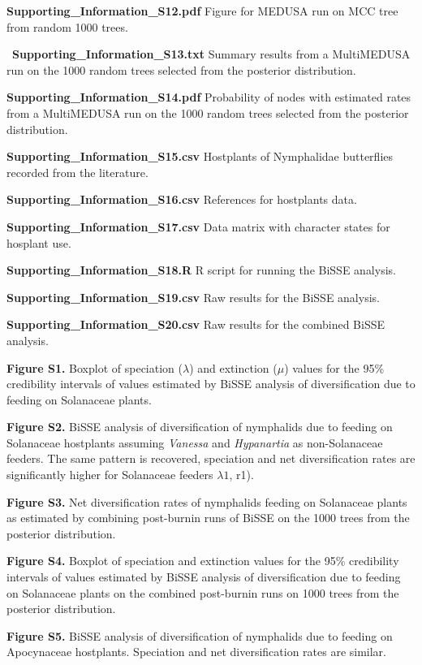 \documentclass[10pt]{article}
\begin{document}
\begin{description}
 \item {\bf Supporting\_Information\_S12.pdf} Figure for MEDUSA run on MCC
tree from random 1000 trees.

 \item {\bf Supporting\_Information\_S13.txt} Summary results from a
MultiMEDUSA run on the 1000 random trees selected from the posterior
distribution.

 \item {\bf Supporting\_Information\_S14.pdf} Probability of nodes with
estimated rates from a MultiMEDUSA run on the 1000 random trees selected
from the posterior distribution.

 \item {\bf Supporting\_Information\_S15.csv} Hostplants of Nymphalidae
butterflies recorded from the literature.

 \item {\bf Supporting\_Information\_S16.csv} References for hostplants
data.

 \item {\bf Supporting\_Information\_S17.csv} Data matrix with character
states for hosplant use.

 \item {\bf Supporting\_Information\_S18.R} R script for running the BiSSE
analysis.

 \item {\bf Supporting\_Information\_S19.csv} Raw results for the BiSSE
analysis.

 \item {\bf Supporting\_Information\_S20.csv} Raw results for the combined
BiSSE analysis.

 \item {\bf Figure S1.} Boxplot of speciation ($\lambda$) and extinction
($\mu$) values for the 95\% credibility intervals of values estimated
by BiSSE analysis of diversification due to feeding on Solanaceae
plants.

 \item {\bf Figure S2.} BiSSE analysis of diversification of nymphalids due
to feeding on Solanaceae hostplants assuming \emph{Vanessa} and
\emph{Hypanartia} as non-Solanaceae feeders. The same pattern is
recovered, speciation and net diversification rates are significantly
higher for Solanaceae feeders $\lambda1$, r1).

 \item {\bf Figure S3.} Net diversification rates of nymphalids feeding on
Solanaceae plants as estimated by combining post-burnin runs of BiSSE on
the 1000 trees from the posterior distribution.

 \item {\bf Figure S4.} Boxplot of speciation and extinction values for the
95\% credibility intervals of values estimated by BiSSE analysis of
diversification due to feeding on Solanaceae plants on the combined
post-burnin runs on 1000 trees from the posterior distribution.

 \item {\bf Figure S5.} BiSSE analysis of diversification of nymphalids due
to feeding on Apocynaceae hostplants. Speciation and net diversification
rates are similar.
\end{description}
\end{document}
